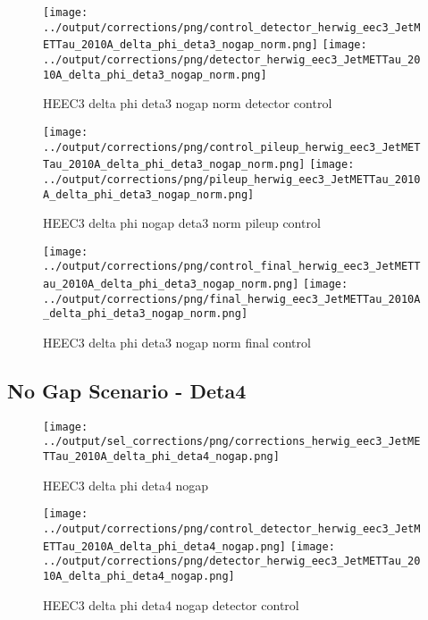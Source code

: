 \documentclass[11pt]{book}
\begin{document}
\begin{figure}[ht]
\centering
\texttt{[image: ../output/corrections/png/control\_detector\_herwig\_eec3\_JetMETTau\_2010A\_delta\_phi\_deta3\_nogap\_norm.png]}
\texttt{[image: ../output/corrections/png/detector\_herwig\_eec3\_JetMETTau\_2010A\_delta\_phi\_deta3\_nogap\_norm.png]}
\caption{HEEC3 delta phi deta3 nogap norm detector control}
\label{fig:HEEC3_JetMETTau_2010A_delta_phi_deta3_nogap_norm_detector_control}
\end{figure}

\begin{figure}[ht]
\centering
\texttt{[image: ../output/corrections/png/control\_pileup\_herwig\_eec3\_JetMETTau\_2010A\_delta\_phi\_deta3\_nogap\_norm.png]}
\texttt{[image: ../output/corrections/png/pileup\_herwig\_eec3\_JetMETTau\_2010A\_delta\_phi\_deta3\_nogap\_norm.png]}
\caption{HEEC3 delta phi nogap deta3 norm pileup control}
\label{fig:HEEC3_JetMETTau_2010A_delta_phi_deta3_nogap_norm_pileup_control}
\end{figure}


\begin{figure}[ht]
\centering
\texttt{[image: ../output/corrections/png/control\_final\_herwig\_eec3\_JetMETTau\_2010A\_delta\_phi\_deta3\_nogap\_norm.png]}
\texttt{[image: ../output/corrections/png/final\_herwig\_eec3\_JetMETTau\_2010A\_delta\_phi\_deta3\_nogap\_norm.png]}
\caption{HEEC3 delta phi deta3 nogap norm final control}
\label{fig:HEEC3_JetMETTau_2010A_delta_phi_deta3_nogap_norm_final_control}
\end{figure}




\clearpage
\subsection{No Gap Scenario - Deta4}

\begin{figure}[ht]
\centering
\texttt{[image: ../output/sel\_corrections/png/corrections\_herwig\_eec3\_JetMETTau\_2010A\_delta\_phi\_deta4\_nogap.png]}
\caption{HEEC3 delta phi deta4 nogap}
\label{fig:HEEC3_JetMETTau_2010A_delta_phi_deta4_nogap}
\end{figure}

\begin{figure}[ht]
\centering
\texttt{[image: ../output/corrections/png/control\_detector\_herwig\_eec3\_JetMETTau\_2010A\_delta\_phi\_deta4\_nogap.png]}
\texttt{[image: ../output/corrections/png/detector\_herwig\_eec3\_JetMETTau\_2010A\_delta\_phi\_deta4\_nogap.png]}
\caption{HEEC3 delta phi deta4 nogap detector control}
\label{fig:HEEC3_JetMETTau_2010A_delta_phi_deta4_nogap_detector_control}
\end{figure}
\end{document}
